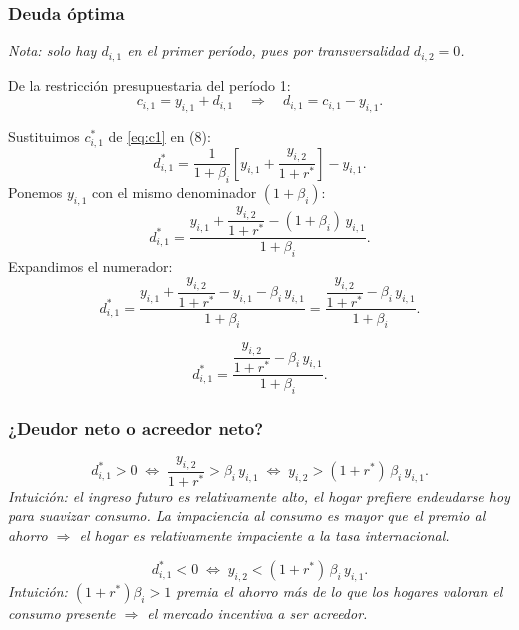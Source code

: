 \subsubsection*{Deuda óptima}

\textit{Nota: solo hay $d_{i,1}$ en el primer período, pues por transversalidad
$d_{i,2}=0$.}

De la restricción presupuestaria del período 1:
\[
    c_{i,1} = y_{i,1} + d_{i,1}
    \quad\Longrightarrow\quad
    d_{i,1} = c_{i,1} - y_{i,1}.
    \tag{8}
\]

Sustituimos $c_{i,1}^*$ de \eqref{eq:c1} en (8):
\[
    d_{i,1}^* = \frac{1}{1+\beta_i}\left[y_{i,1} + \frac{y_{i,2}}{1+r^*}\right] - y_{i,1}.
\]
Ponemos $y_{i,1}$ con el mismo denominador $(1+\beta_i)$:
\[
    d_{i,1}^* = \frac{y_{i,1} + \dfrac{y_{i,2}}{1+r^*} - (1+\beta_i)\,y_{i,1}}{1+\beta_i}.
\]
Expandimos el numerador:
\[
    d_{i,1}^* = \frac{y_{i,1} + \dfrac{y_{i,2}}{1+r^*} - y_{i,1} - \beta_i\,y_{i,1}}{1+\beta_i}
    = \frac{\dfrac{y_{i,2}}{1+r^*} - \beta_i\,y_{i,1}}{1+\beta_i}.
\]

\begin{resultado}
\[
    d_{i,1}^* = \frac{\dfrac{y_{i,2}}{1+r^*} - \beta_i\,y_{i,1}}{1+\beta_i}.
\]
\end{resultado}

\subsubsection*{¿Deudor neto o acreedor neto?}

\begin{condicion}
\[
    d_{i,1}^* > 0
    \;\Longleftrightarrow\;
    \frac{y_{i,2}}{1+r^*} > \beta_i\,y_{i,1}
    \;\Longleftrightarrow\;
    y_{i,2} > (1+r^*)\,\beta_i\,y_{i,1}.
\]
\textit{Intuición: el ingreso futuro es relativamente alto, el hogar prefiere
endeudarse hoy para suavizar consumo. La impaciencia al consumo es mayor
que el premio al ahorro $\Rightarrow$ el hogar es relativamente impaciente
a la tasa internacional.}
\end{condicion}

\begin{condicion}
\[
    d_{i,1}^* < 0
    \;\Longleftrightarrow\;
    y_{i,2} < (1+r^*)\,\beta_i\,y_{i,1}.
\]
\textit{Intuición: $(1+r^*)\beta_i > 1$ premia el ahorro más de lo que los
hogares valoran el consumo presente $\Rightarrow$ el mercado incentiva a ser
acreedor.}
\end{condicion}

